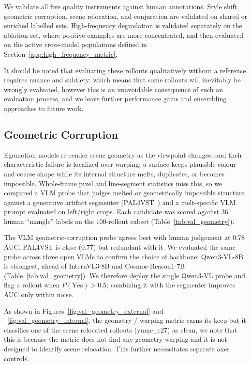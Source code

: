 \documentclass[letterpaper]{article} %
\begin{document}
We validate all five quality instruments against human annotations. Style
shift, geometric corruption, scene relocation, and conjuration are validated
on shared or enriched labelled sets. High-frequency degradation is validated
separately on the ablation set, where positive examples are more concentrated,
and then evaluated on the active cross-model populations defined in
Section~\ref{app:high_frequency_metric}.

It should be noted that evaluating these rollouts qualitatively without a reference requires nuance and subtlety; which means that some rollouts will inevitably be wrongly evaluated, however this is an unavoidable consequence of such an evaluation process, and we leave further performance gains and ensembling approaches to future work.

\subsection{Geometric Corruption}
\label{app:val_geometry}

Egomotion models re-render scene geometry as the viewpoint changes, and their
characteristic failure is localized over-warping: a surface keeps plausible
colour and coarse shape while its internal structure melts, duplicates, or
becomes impossible. Whole-frame pixel and line-segment statistics miss this, so
we compared a VLM probe that judges melted or geometrically impossible structure
against a generative artifact segmenter (PAL4VST~\cite{pal}) and a melt-specific
VLM prompt evaluated on left/right crops. Each candidate was scored against $36$
human ``mangle'' labels on the $100$-rollout subset
(Table~\ref{tab:val_geometry}).

The VLM geometric-corruption probe agrees best with human judgement at $0.78$
AUC. PAL4VST is close ($0.77$) but redundant with it. We evaluated the same
probe across three open VLMs to confirm the choice of backbone: Qwen3-VL-8B is
strongest, ahead of InternVL3-8B and Cosmos-Reason1-7B
(Table~\ref{tab:val_geometry}). We therefore deploy the single Qwen3-VL probe
and flag a rollout when $P(\mathrm{Yes})>0.5$; combining it with the segmenter
improves AUC only within noise.

As shown in Figures~\ref{fig:val_geometry_external} and ~\ref{fig:val_geometry_internal}, the geometry / warping metric earns its keep but it classifies one of the scene relocated rollouts (yume\_r27) as clean, we note that this is because the metric does not find any geometry warping and it is not designed to identify scene relocation. This further necessitates separate axes controls.
\end{document}
